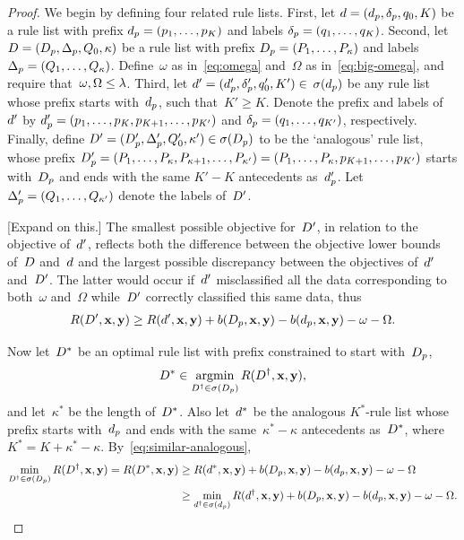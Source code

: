 \begin{proof}
We begin by defining four related rule lists.
%
First, let ${{d} = (d_p, \delta_p, q_0, K)}$
be a rule list with prefix ${d_p = (p_1, \dots, p_K)}$
and labels ${\delta_p = (q_1, \dots, q_K)}$.
%
Second, let ${{D} = (D_p, \Delta_p, Q_0, \kappa)}$
be a rule list with prefix ${D_p = (P_1, \dots, P_\kappa)}$
and labels ${\Delta_p = (Q_1, \dots, Q_\kappa)}$.
%
Define~$\omega$ as in~\eqref{eq:omega}
and~$\Omega$ as in~\eqref{eq:big-omega},
and require that~${\omega, \Omega \le {\lambda}}$.
%
Third, let ${{d}' = (d_p', \delta_p', q_0', K') \in}$
${\sigma(d_p)}$ be any rule list
whose prefix starts with~$d_p$, such that~${K' \ge K}$.
%
Denote the prefix and labels of~${d}'$ by
${d_p' = (p_1, \dots, p_K, p_{K+1}, \dots, p_{K'})}$
and ${\delta_p = (q_1, \dots, q_{K'})}$,
respectively.
%
Finally, define
${{D}' = (D_p', \Delta_p', Q_0', \kappa') \in \sigma(D_p)}$
to be the `analogous' rule list, \ie whose prefix
${D_p' = (P_1, \dots, P_\kappa, P_{\kappa+1}, \dots, P_{\kappa'})
= (P_1, \dots, P_\kappa, p_{K+1}, \dots, p_{K'})}$
starts with~$D_p$ and ends with the same ${K'-K}$
antecedents as~$d_p'$.
%
Let ${\Delta_p' = (Q_1, \dots, Q_{\kappa'})}$
denote the labels of~${D}'$.

[Expand on this.]
%
The smallest possible objective for~${D}'$, in relation
to the objective of~${d}'$, reflects both the difference
between the objective lower bounds of~${D}$ and~${d}$
and the largest possible discrepancy between the
objectives of~${d}'$ and~${D}'$.
%
The latter would occur if~${d}'$ misclassified all the data
corresponding to both~$\omega$ and~$\Omega$ while~${D}'$
correctly classified this same data, thus
\begin{align}
\Obj(\RLB', \x, \y) \ge \Obj(\RL', \x, \y)
  + b(\PrefixB, \x, \y) - b(\Prefix, \x, \y) - \omega - \Omega.
\label{eq:similar-analogous}
\end{align}
%

Now let~${D}^*$ be an optimal rule list with prefix
constrained to start with~$D_p$,
\begin{align}
\RLB^* \in \argmin_{\RLB^\dagger \in \StartsWith(\PrefixB)} \Obj(\RLB^\dagger, \x, \y),
\end{align}
and let~$\kappa^*$ be the length of~${D}^*$.
%
Also let~${d}^*$ be the analogous $K^*$-rule list whose prefix
starts with~$d_p$ and ends with the same~${\kappa^* - \kappa}$
antecedents as~${D}^*$, where~${K^* = K + \kappa^* - \kappa}$.
%
By~\eqref{eq:similar-analogous},
\begin{align}
\min_{\RLB^\dagger \in \StartsWith(\PrefixB)} \Obj(\RLB^\dagger, \x, \y)
= \Obj(\RLB^*, \x, \y) &\ge \Obj(\RL^*, \x, \y)
  + b(\PrefixB, \x, \y) - b(\Prefix, \x, \y) - \omega - \Omega \nn \\
&\ge \min_{\RL^\dagger \in \StartsWith(\Prefix)} \Obj(\RL^\dagger, \x, \y)
  + b(\PrefixB, \x, \y) - b(\Prefix, \x, \y) - \omega - \Omega.
\end{align}

\end{proof}


